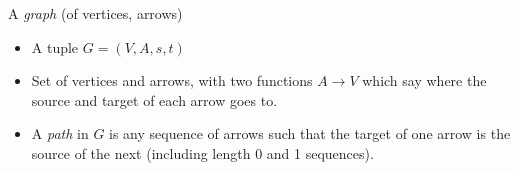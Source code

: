 

A \emph{graph} (of vertices, arrows)

\begin{itemize}
    \item A tuple $G=(V, A, s, t)$
    \item Set of vertices and arrows, with two functions $A\rightarrow V$ which say where the source and target of each arrow goes to.
    \item A \emph{path} in $G$ is any sequence of arrows such that the target of one arrow is the source of the next (including length 0 and 1 sequences).
  \end{itemize}